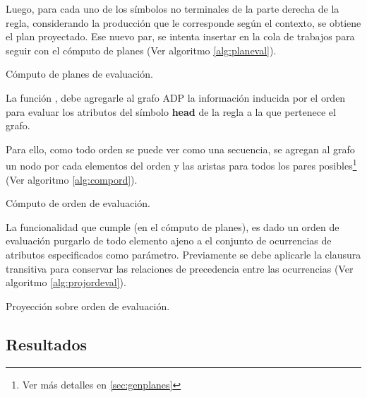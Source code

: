 Luego, para cada uno de los símbolos no terminales de la parte derecha de la regla, considerando la producción que le corresponde según el contexto, se obtiene el plan proyectado. Ese nuevo par, se intenta insertar en la cola de trabajos para seguir con el cómputo de planes (Ver algoritmo \ref{alg:planeval}).

\begin{algorithm}[!ht]

\vspace{-0.5cm}
\caption{\label{alg:planeval}Cómputo de planes de evaluación.}
\end{algorithm}

La función , debe agregarle al grafo ADP la información inducida por el orden para evaluar los atributos del símbolo \textbf{head} de la regla a la que pertenece el grafo.

Para ello, como todo orden se puede ver como una secuencia, se agregan al grafo un nodo por cada elementos del orden y las aristas para todos los pares posibles\footnote{Ver más detalles en \ref{sec:genplanes}} (Ver algoritmo \ref{alg:compord}).

\begin{algorithm}[!ht]

\vspace{-0.5cm}
\caption{\label{alg:compord}Cómputo de orden de evaluación.}
\end{algorithm}

La funcionalidad que cumple  (en el cómputo de planes), es dado un orden de evaluación purgarlo de todo elemento ajeno a el conjunto de ocurrencias de atributos especificados como parámetro. Previamente se debe aplicarle la clausura transitiva para conservar las relaciones de precedencia entre las ocurrencias (Ver algoritmo \ref{alg:projordeval}).

\begin{algorithm}[!ht]

\vspace{-0.5cm}
\caption{\label{alg:projordeval}Proyección sobre orden de evaluación.}
\end{algorithm}

\subsection*{Resultados}



